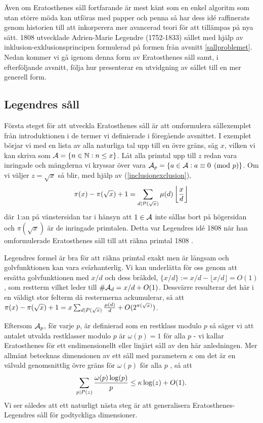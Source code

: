 
Även om Eratosthenes såll fortfarande är mest känt som en enkel algoritm som utan större möda kan utföras med papper och penna så har dess idé raffinerats genom historien till att inkorperera mer avancerad teori för att tillämpas på nya sätt. 1808 utvecklade Adrien-Marie Legendre (1752-1833) sållet med hjälp av inklusion-exklusionsprincipen formulerad på formen från avsnitt \ref{sallproblemet}. Nedan kommer vi gå igenom denna form av Eratosthenes såll samt, i efterföljande avsnitt, följa hur \cite{cojocarumurty} presenterar en utvidgning av sållet till en mer generell form. 

\subsection{Legendres såll}

Första steget för att utveckla Eratosthenes såll är att omformulera sållexemplet från introduktionen i de termer vi definierade i föregående avsnittet. I exemplet börjar vi med en lista av alla naturliga tal upp till en övre gräns, säg $x$, vilken vi kan skriva som $\mathcal{A} = \{n \in \mathbb{N} : n \leq x\}$. Låt alla primtal upp till $z$ redan vara inringade och mängderna vi kryssar över vara \(\mathcal{A}_p = \{a \in \mathcal{A} :  a \equiv 0 \pmod{p}\}\). Om vi väljer $z = \sqrt{x}$ så blir, med hjälp av (\ref{inclusionexclusion}),
\begin{align*}
    \pi(x) - \pi(\sqrt{x}) + 1 = \sum_{d \mid \mathcal{P}(\sqrt{x})} \mu(d) \left\lfloor \frac{x}{d} \right\rfloor  
\end{align*}
där \(1\):an på vänstersidan tar i hänsyn att \(1 \in \mathcal{A}\) inte sållas bort på högersidan och \(\pi(\sqrt{x})\) är de inringade primtalen. Detta var Legendres idé 1808 när han omformulerade Eratosthenes såll till att räkna primtal 1808 \cite{opera}. 

Legendres formel är bra för att räkna primtal exakt men är långsam och golvfunktionen kan vara svårhanterlig. Vi kan underlätta för oss genom att ersätta golvfunktionen med $x/d$ och dess bråkdel, \(\{x/d\} := x/d - \lfloor x/d \rfloor = O(1)\), som restterm vilket leder till \(\# \mathcal{A}_d = x/d + O(1)\). Dessvärre resulterar det här i en väldigt stor felterm då restermerna ackumulerar, så att \(\pi(x) - \pi(\sqrt{x}) + 1 = x \sum_{d \mid P(\sqrt{x})}\frac{\mu(d)}{d} + O(2^{\pi(\sqrt{x})}) \).

Eftersom \(\mathcal{A}_p\), för varje $p$, är definierad som en restklass modulo $p$ så säger vi att antalet utvalda restklasser modulo $p$ är $\omega(p) = 1$ för alla $p$ - vi kallar Eratosthenes för ett endimensionellt eller linjärt såll av den här anledningen. Mer allmänt betecknas dimensionen av ett såll med parametern \(\kappa\) om det är en välvald genomsnittlig övre gräns för \(\omega(p)\) för alla $p$ \cite{tenenbaum}, så att
\begin{align} \label{dimension}
    \sum_{p \mid P(z)} \frac{\omega(p) \log(p)}{p} \leq \kappa \log(z) + O(1).
\end{align}
Vi ser således att ett naturligt nästa steg är att generalisera Eratosthenes-Legendres såll för godtyckliga dimensioner. 

